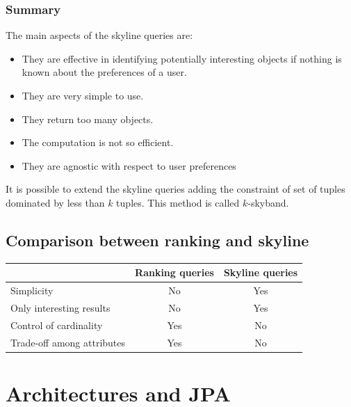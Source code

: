 \documentclass[12pt, a4paper]{report}
\newtheorem[style=M,bodystyle=\normalfont]{theorem}{Theorem}
\newtheorem[style=M,bodystyle=\normalfont]{corollary}{Corollary}
\newtheorem[style=M,bodystyle=\normalfont]{lemma}{Lemma}
\newtheorem[style=M,bodystyle=\normalfont]{definition}{Definition}
\begin{document}
    \subsection{Summary}
    The main aspects of the skyline queries are: 
    \begin{itemize}
        \item They are effective in identifying potentially interesting objects if nothing is known about the preferences of a user. 
        \item They are very simple to use. 
        \item They return too many objects. 
        \item The computation is not so efficient. 
        \item They are agnostic with respect to user preferences
    \end{itemize}
    It is possible to extend the skyline queries adding the constraint of set of tuples dominated by less than $k$ tuples. This method is called $k$-skyband.

    \section{Comparison between ranking and skyline}
    \begin{table}[H]
        \centering
        \begin{tabular}{l|cc|}
        \cline{2-3}
                                                         & \textbf{Ranking queries} & \textbf{Skyline queries} \\ \hline
        \multicolumn{1}{|l|}{Simplicity}                 & No              & Yes             \\
        \multicolumn{1}{|l|}{Only interesting results}   & No              & Yes             \\
        \multicolumn{1}{|l|}{Control of cardinality}     & Yes             & No              \\
        \multicolumn{1}{|l|}{Trade-off among attributes} & Yes             & No              \\ \hline
        \end{tabular}
    \end{table}

\newpage 

\chapter{Architectures and JPA}
\end{document}
